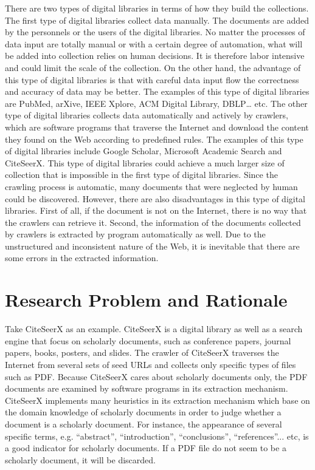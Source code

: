 \documentclass[prodmode]{acmsmall} %
\begin{document}
There are two types of digital libraries in terms of how they build the collections. The first type of digital libraries collect data manually. The documents are added by the personnels or the users of the digital libraries. No matter the processes of data input are totally manual or with a certain degree of automation, what will be added into collection relies on human decisions. It is therefore labor intensive and could limit the scale of the collection. On the other hand, the advantage of this type of digital libraries is that with careful data input flow the correctness and accuracy of data may be better. The examples of this type of digital libraries are PubMed, arXive, IEEE Xplore, ACM Digital Library, DBLP… etc. The other type of digital libraries collects data automatically and actively by crawlers, which are software programs that traverse the Internet and download the content they found on the Web according to predefined rules. The examples of this type of digital libraries include Google Scholar, Microsoft Academic Search and CiteSeerX. This type of digital libraries could achieve a much larger size of collection that is impossible in the first type of digital libraries. Since the crawling process is automatic, many documents that were neglected by human could be discovered. However, there are also disadvantages in this type of digital libraries. First of all, if the document is not on the Internet, there is no way that the crawlers can retrieve it. Second, the information of the documents collected by crawlers is extracted by program automatically as well. Due to the unstructured and inconsistent nature of the Web, it is inevitable that there are some errors in the extracted information.

\section{Research Problem and Rationale}

Take CiteSeerX as an example. CiteSeerX is a digital library as well as a search engine that focus on scholarly documents, such as conference papers, journal papers, books, posters, and slides. The crawler of CiteSeerX traverses the Internet from several sets of seed URLs and collects only specific types of files such as PDF. Because CiteSeerX cares about scholarly documents only, the PDF documents are examined by software programs in its extraction mechanism. CiteSeerX implements many heuristics in its extraction mechanism which base on the domain knowledge of scholarly documents in order to judge whether a document is a scholarly document. For instance, the appearance of several specific terms, e.g. “abstract”, “introduction”, “conclusions”, “references”... etc, is a good indicator for scholarly documents. If a PDF file do not seem to be a scholarly document, it will be discarded.
\end{document}
